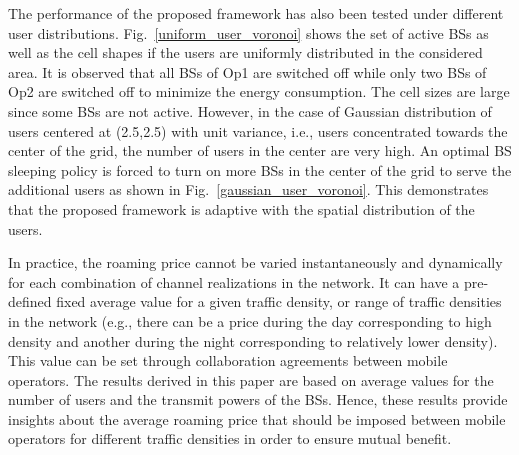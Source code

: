 \documentclass[10pt, letter, twocolumn]{IEEEtran}
\begin{document}
The performance of the proposed framework has also been tested under different user distributions. Fig.~\ref{uniform_user_voronoi} shows the set of active BSs as well as the cell shapes if the users are uniformly distributed in the considered area. It is observed that all BSs of Op1 are switched off while only two BSs of Op2 are switched off to minimize the energy consumption. The cell sizes are large since some BSs are not active. However, in the case of Gaussian distribution of users centered at (2.5,2.5) with unit variance, i.e., users concentrated towards the center of the grid, the number of users in the center are very high. An optimal BS sleeping policy is forced to turn on more BSs in the center of the grid to serve the additional users as shown in Fig.~\ref{gaussian_user_voronoi}. This demonstrates that the proposed framework is adaptive with the spatial distribution of the users.

In practice, the roaming price cannot be varied instantaneously and dynamically for each combination of channel realizations in the network. It can have a pre-defined fixed average value for a given traffic density, or range of traffic densities in the network (e.g., there can be a price during the day corresponding to high density and another during the night corresponding to relatively lower density). This value can be set through collaboration agreements between mobile operators. The results derived in this paper are based on average values for the number of users and the transmit powers of the BSs. Hence, these results provide insights about the average roaming price that should be imposed between mobile operators for different traffic densities in order to ensure mutual benefit.
\end{document}
